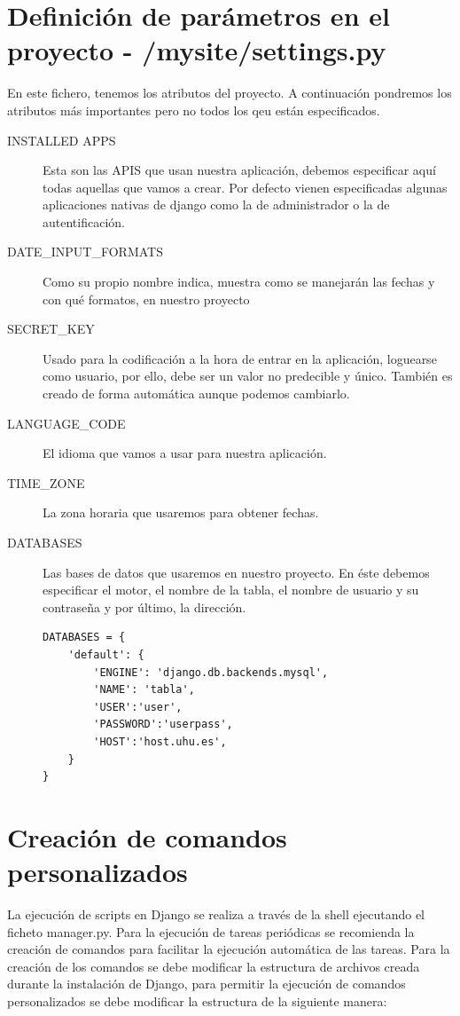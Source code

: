 \section{Definición de parámetros en el proyecto - /mysite/settings.py}
	
En este fichero, tenemos los atributos del proyecto. A continuación pondremos los atributos más importantes pero no todos los qeu están especificados.

\begin{description}

	\item[INSTALLED APPS]
		Esta son las APIS que usan nuestra aplicación, debemos especificar aquí todas aquellas que vamos a crear. Por defecto vienen especificadas algunas aplicaciones nativas de django como la de administrador o la de autentificación.
	\item[DATE\_INPUT\_FORMATS]
		Como su propio nombre indica, muestra como se manejarán las fechas y con qué formatos, en nuestro proyecto
	\item[SECRET\_KEY]
		Usado para la codificación a la hora de entrar en la aplicación, loguearse como usuario, por ello, debe ser un valor no predecible y único. También es creado de forma automática aunque podemos cambiarlo.
	\item[LANGUAGE\_CODE]
		El idioma que vamos a usar para nuestra aplicación.
	\item[TIME\_ZONE]
		La zona horaria que usaremos para obtener fechas.
	\item[DATABASES]
		Las bases de datos que usaremos en nuestro proyecto. En éste debemos especificar el motor, el nombre de la tabla, el nombre de usuario y su contraseña y por último, la dirección. 
		\begin{lstlisting}
DATABASES = {
    'default': {
        'ENGINE': 'django.db.backends.mysql',
        'NAME': 'tabla',
		'USER':'user',
		'PASSWORD':'userpass',
		'HOST':'host.uhu.es',
    }
}		
		\end{lstlisting}
		\end{description}


\section{Creación de comandos personalizados}

La ejecución de scripts en Django se realiza a través de la shell ejecutando el ficheto manager.py. Para la ejecución de tareas periódicas se recomienda la creación de comandos para facilitar la ejecución automática de las tareas. Para la creación de los comandos se debe modificar la estructura de archivos creada durante la instalación de Django, para permitir la ejecución de comandos personalizados se debe modificar la estructura de la siguiente manera:

